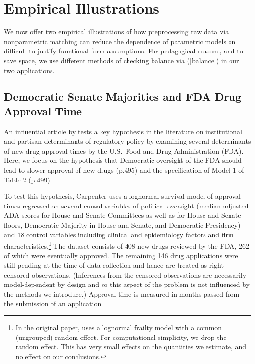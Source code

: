 \documentclass[11pt,titlepage]{article}
\begin{document}
\section{Empirical Illustrations}\label{s:emp}

We now offer two empirical illustrations of how preprocessing raw data
via nonparametric matching can reduce the dependence of parametric
models on difficult-to-justify functional form assumptions.  For
pedagogical reasons, and to save space, we use different methods of
checking balance via (\ref{balance}) in our two applications.

\subsection{Democratic Senate Majorities and FDA Drug Approval
  Time}\label{s:carp}

An influential article by \citet{Carpenter02} tests a key hypothesis
in the literature on institutional and partisan determinants of
regulatory policy by examining several determinants of new drug
approval times by the U.S.\ Food and Drug Administration (FDA).  Here,
we focus on the hypothesis that Democratic oversight of the FDA should
lead to slower approval of new drugs (p.495) and the specification of
Model 1 of Table 2 (p.499).

To test this hypothesis, Carpenter uses a lognormal survival model of
approval times regressed on several causal variables of political
oversight (median adjusted ADA scores for House and Senate Committees
as well as for House and Senate floors, Democratic Majority in House
and Senate, and Democratic Presidency) and 18 control variables
including clinical and epidemiology factors and firm
characteristics.\footnote{In the original paper, \citet{Carpenter02}
  uses a lognormal frailty model with a common (ungrouped) random
  effect.  For computational simplicity, we drop the random effect.
  This has very small effects on the quantities we estimate, and no
  effect on our conclusions.}  The dataset consists of 408 new drugs
reviewed by the FDA, 262 of which were eventually approved.  The
remaining 146 drug applications were still pending at the time of data
collection and hence are treated as right-censored observations.
(Inferences from the censored observations are necessarily
model-dependent by design and so this aspect of the problem is not
influenced by the methods we introduce.)  Approval time is measured in
months passed from the submission of an application.
\end{document}
